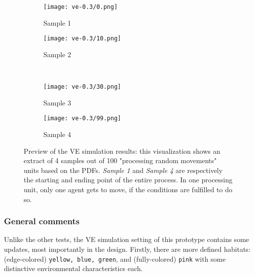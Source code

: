 \begin{figure}[h!]
    \centering
    \begin{subfigure}[b]{0.4\linewidth}
      \texttt{[image: ve-0.3/0.png]}
      \caption{Sample 1}
    \end{subfigure}
    \begin{subfigure}[b]{0.4\linewidth}
      \texttt{[image: ve-0.3/10.png]}
      \caption{Sample 2}
    \end{subfigure} \\ [2ex]
    \begin{subfigure}[b]{0.4\linewidth}
      \texttt{[image: ve-0.3/30.png]}
      \caption{Sample 3}
    \end{subfigure}
    \begin{subfigure}[b]{0.4\linewidth}
      \texttt{[image: ve-0.3/99.png]}
      \caption{Sample 4}
    \end{subfigure}
    \caption{Preview of the VE simulation results: this visualization shows an extract of 4 samples out of 100 "processing random movements" units based on the PDFs. \emph{Sample 1} and \emph{Sample 4} are respectively the starting and ending point of the entire process. In one processing unit, only one agent gets to move, if the conditions are fulfilled to do so. }
    \label{fig:ve-prototype}
\end{figure}

\subsubsection{General comments}
Unlike the other tests, the VE simulation setting of this prototype contains some updates, most importantly in the design. Firstly, there are more defined habitats: (edge-colored) \texttt{yellow, blue, green}, and (fully-colored) \texttt{pink} with some distinctive environmental characteristics each.

